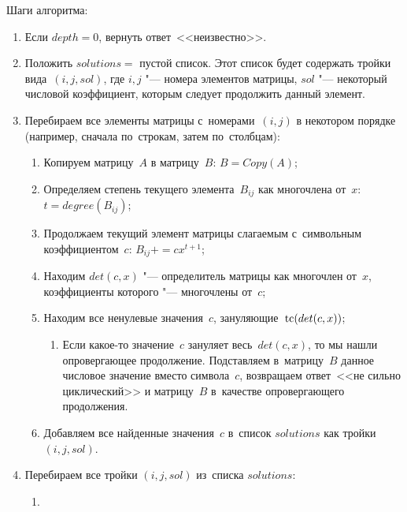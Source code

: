 Шаги алгоритма:
\begin{enumerate}
    \item
        Если $depth = 0$, вернуть ответ~<<неизвестно>>.
    \item
        Положить $solutions = $ пустой список.
        Этот список будет содержать тройки вида~$(i, j, sol)$,
        где $i, j$ "--- номера элементов матрицы, $sol$ "--- некоторый числовой коэффициент,
        которым следует продолжить данный элемент.
    \item
        Перебираем все элементы матрицы с~номерами~$(i, j)$ в некотором порядке (например, сначала по~строкам, затем по~столбцам):
        \begin{enumerate}
            \item
                Копируем матрицу~$A$ в матрицу~$B$: $B = Copy(A)$;
            \item
                Определяем степень текущего элемента~$B_{ij}$ как многочлена от~$x$:
                $t = degree(B_{ij})$;
            \item
                Продолжаем текущий элемент матрицы слагаемым с~символьным коэффициентом~$c$:
                $B_{ij} \mathrel{{+}{=}} cx^{t + 1}$;
            \item
                Находим $det(c, x)$ "--- определитель матрицы \diffMatrix[B] как многочлен от~$x$,
                коэффициенты которого "--- многочлены от~$c$;
            \item
                Находим все ненулевые значения~$c$, зануляющие~$\mathop{\rm tc}(det(c, x))$;
                \begin{enumerate}
                    \item
                        Если какое-то значение~$c$ зануляет весь~$det(c, x)$,
                        то мы нашли опровергающее продолжение.
                        Подставляем в~матрицу~$B$ данное числовое значение вместо символа~$c$,
                        возвращаем ответ~<<не сильно циклический>> и матрицу~$B$ в~качестве опровергающего продолжения.
                \end{enumerate}
            \item
                Добавляем все найденные значения~$c$ в~список $solutions$ как тройки~$(i, j, sol)$.
        \end{enumerate}
    \item
        Перебираем все тройки $(i, j, sol)$ из~списка $solutions$:
        \begin{enumerate}
            \item

\end{enumerate}
\end{enumerate}
